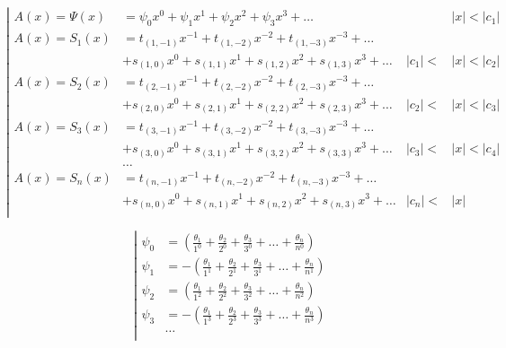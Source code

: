 \begin{equation*} \left| \begin{aligned}
A(x) = \Psi(x) &=
  \psi_0 x^0 
+ \psi_1 x^1
+ \psi_2 x^2 
+ \psi_3 x^3 
+ \ldots &
&|x| < |c_1| \\
%
A(x) = S_1(x) &= 
  t_{(1,-1)} x^{-1}
+ t_{(1,-2)} x^{-2}
+ t_{(1,-3)} x^{-3}
+ \ldots \\ &
+ s_{(1,0)} x^0
+ s_{(1,1)} x^1
+ s_{(1,2)} x^2
+ s_{(1,3)} x^3
+ \ldots &
|c_1| < &|x| < |c_2| \\
%
A(x) = S_2(x) &= 
  t_{(2,-1)} x^{-1}
+ t_{(2,-2)} x^{-2}
+ t_{(2,-3)} x^{-3}
+ \ldots \\ &
+ s_{(2,0)} x^0
+ s_{(2,1)} x^1
+ s_{(2,2)} x^2
+ s_{(2,3)} x^3
+ \ldots &
|c_2| < &|x| < |c_3| \\
%
A(x) = S_3(x) &= 
  t_{(3,-1)} x^{-1}
+ t_{(3,-2)} x^{-2}
+ t_{(3,-3)} x^{-3}
+ \ldots \\ &
+ s_{(3,0)} x^0
+ s_{(3,1)} x^1
+ s_{(3,2)} x^2
+ s_{(3,3)} x^3
+ \ldots &
|c_3| < &|x| < |c_4| \\
%
&\ldots \\
%
A(x) = S_n(x) &= 
  t_{(n,-1)} x^{-1}
+ t_{(n,-2)} x^{-2}
+ t_{(n,-3)} x^{-3}
+ \ldots \\ &
+ s_{(n,0)} x^0
+ s_{(n,1)} x^1
+ s_{(n,2)} x^2
+ s_{(n,3)} x^3
+ \ldots &
|c_n| < &|x| \\
\end{aligned} \right. \end{equation*}

\begin{equation*} \left| \begin{aligned}
\psi_0 &= \left(
  \frac{\theta_1}{1^0}
+ \frac{\theta_2}{2^0}
+ \frac{\theta_3}{3^0}
+ \ldots
+ \frac{\theta_n}{n^0} \right) \\
%
\psi_1 &= - \left(
  \frac{\theta_1}{1^1}
+ \frac{\theta_2}{2^1}
+ \frac{\theta_3}{3^1}
+ \ldots
+ \frac{\theta_n}{n^1} \right) \\
%
\psi_2 &= \left(
  \frac{\theta_1}{1^2}
+ \frac{\theta_2}{2^2}
+ \frac{\theta_3}{3^2}
+ \ldots
+ \frac{\theta_n}{n^2} \right) \\
%
\psi_3 &= - \left(
  \frac{\theta_1}{1^3}
+ \frac{\theta_2}{2^3}
+ \frac{\theta_3}{3^3}
+ \ldots
+ \frac{\theta_n}{n^3} \right) \\
%
&\ldots \\
\end{aligned} \right. \end{equation*}


